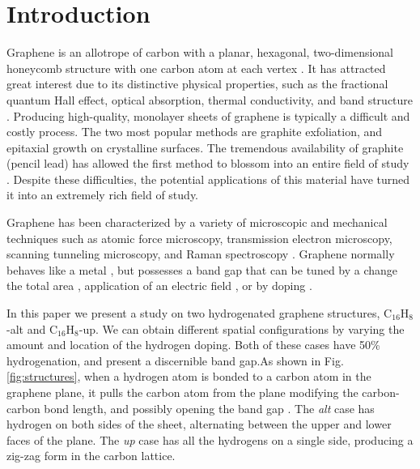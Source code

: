 \documentclass[pss]{wiley2sp} %
\begin{document}
\maketitle


\section{Introduction}\label{sec:intro}

Graphene is an allotrope of carbon with a planar, hexagonal, two-dimensional
honeycomb structure with one carbon atom at each vertex \cite{geim2007rise}.
It has attracted great interest due to its distinctive physical properties,
such as the fractional quantum Hall effect, optical absorption, thermal
conductivity, and band structure \cite{geim2007rise,nair2008fine}. Producing
high-quality, monolayer sheets of graphene is typically a difficult and costly
process. The two most popular methods are graphite exfoliation, and epitaxial
growth on crystalline surfaces. The tremendous availability of graphite
(pencil lead) has allowed the first method to blossom into an entire field of
study \cite{novoselovPNAS05,chungJES00,choiCC10,caiJMC12,hernandezNN08}.
Despite these difficulties, the potential applications of this material have
turned it into an extremely rich field of study.

Graphene has been characterized by a variety of microscopic and mechanical
techniques such as atomic force microscopy, transmission electron microscopy,
scanning tunneling microscopy, and Raman spectroscopy
\cite{geim2007rise,rao2009graphene,boehm1994nomenclature,novoselov2005two}.
Graphene normally behaves like a metal \cite{geim2007rise}, but possesses a
band gap that can be tuned by a change the total area \cite{han2007energy},
application of an electric field \cite{zhang2009direct}, or by doping 
\cite{ohta2006controlling,elias2009control,guisinger2009exposure,%
samarakoon2010tunable}.

In this paper we present a study on two hydrogenated graphene structures,
C$_{16}$H$_{8}$-alt and C$_{16}$H$_{8}$-up. We can obtain different spatial
configurations by varying the amount and location of the hydrogen doping. Both
of these cases have 50\% hydrogenation, and present a discernible band gap.As
shown in Fig. \ref{fig:structures}, when a hydrogen atom is bonded to a carbon
atom in the graphene plane, it pulls the carbon atom from the plane modifying
the carbon-carbon bond length, and possibly opening the band gap
\cite{samarakoon2010tunable}. The \emph{alt} case has hydrogen on both sides
of the sheet, alternating between the upper and lower faces of the plane. The
\emph{up} case has all the hydrogens on a single side, producing a zig-zag
form in the carbon lattice.
\end{document}

